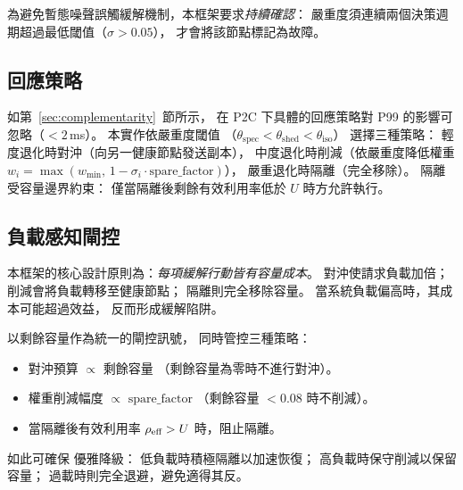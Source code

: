 為避免暫態噪聲誤觸緩解機制，本框架要求\emph{持續確認}：
嚴重度須連續兩個決策週期超過最低閾值（$\sigma > 0.05$），
才會將該節點標記為故障。

\subsection{回應策略}
\label{sec:strategies}

如第~\ref{sec:complementarity}~節所示，
在 P2C 下具體的回應策略對 P99 的影響可忽略（$< 2$\,ms）。
本實作依嚴重度閾值
（$\theta_{\text{spec}} < \theta_{\text{shed}} < \theta_{\text{iso}}$）
選擇三種策略：
輕度退化時對沖（向另一健康節點發送副本），
中度退化時削減（依嚴重度降低權重 $w_i = \max(w_{\min},\, 1 - \sigma_i \cdot \text{spare\_factor})$），
嚴重退化時隔離（完全移除）。
隔離受容量邊界約束：
僅當隔離後剩餘有效利用率低於 $U$ 時方允許執行。

\subsection{負載感知閘控}

本框架的核心設計原則為：\emph{每項緩解行動皆有容量成本}。
對沖使請求負載加倍；
削減會將負載轉移至健康節點；
隔離則完全移除容量。
當系統負載偏高時，其成本可能超過效益，
反而形成緩解陷阱。

\system{} 以剩餘容量作為統一的閘控訊號，
同時管控三種策略：
\begin{itemize}
\item 對沖預算 $\propto$ 剩餘容量
  （剩餘容量為零時不進行對沖）。
\item 權重削減幅度 $\propto$ $\text{spare\_factor}$
  （剩餘容量 $< 0.08$ 時不削減）。
\item 當隔離後有效利用率 $\rho_{\text{eff}} > U$ 時，阻止隔離。
\end{itemize}

如此可確保 \system{} 優雅降級：
低負載時積極隔離以加速恢復；
高負載時保守削減以保留容量；
過載時則完全退避，避免適得其反。
